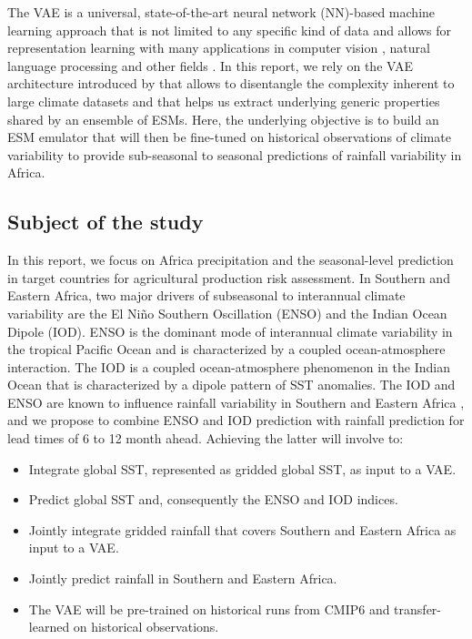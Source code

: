 \documentclass[english,a4paper,10pt]{scrartcl}
\begin{document}
The VAE is a universal, state-of-the-art neural network (NN)-based machine learning approach \citep{Kingma.Welling.2014} that is not limited to any specific kind of data and allows for representation learning with many applications in computer vision \citep{Higgins.Matthey.ea.2017,Chen.Li.ea.2018,Dosovitskiy.Djolonga.2020}, natural language processing \citep{Bowman.Vilnis.ea.2015} and other fields \citep{Hafner.Lillicrap.ea.2021}. In this report, we rely on the VAE architecture introduced by \cite{Groth.Chavez.2023} that allows to disentangle the complexity inherent to large climate datasets and that helps us extract underlying generic properties shared by an ensemble of ESMs. Here, the underlying objective is to build an ESM emulator that will then be fine-tuned on historical observations of climate variability to provide sub-seasonal to seasonal predictions of rainfall variability in Africa.

\subsection{Subject of the study}

In this report, we focus on Africa precipitation and the seasonal-level prediction in target countries for agricultural production risk assessment. In Southern and Eastern Africa, two major drivers of subseasonal to interannual climate variability are the El Niño Southern Oscillation (ENSO) and the Indian Ocean Dipole (IOD). ENSO is the dominant mode of interannual climate variability in the tropical Pacific Ocean and is characterized by a coupled ocean-atmosphere interaction. The IOD is a coupled ocean-atmosphere phenomenon in the Indian Ocean that is characterized by a dipole pattern of SST anomalies. The IOD and ENSO are known to influence rainfall variability in Southern and Eastern Africa \citep{Kundzewicz.Szwed.ea.2019,Nicholson.2017}, and we propose to combine ENSO and IOD prediction with rainfall prediction for lead times of 6 to 12 month ahead. Achieving the latter will involve to:

\begin{itemize}
    \item Integrate global SST, represented as gridded global SST, as input to a VAE.
    \item Predict global SST and, consequently the ENSO and IOD indices.
    \item Jointly integrate gridded rainfall that covers Southern and Eastern Africa as input to a VAE.
    \item Jointly predict rainfall in Southern and Eastern Africa.
    \item The VAE will be pre-trained on historical runs from CMIP6 and transfer-learned on historical observations.
\end{itemize}
\end{document}

